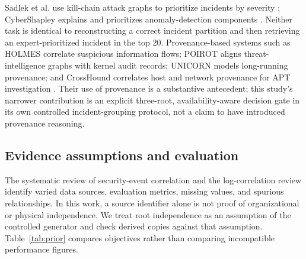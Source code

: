 Sadlek et al. use kill-chain attack graphs to prioritize incidents by severity \cite{sadlek2025}; CyberShapley explains and prioritizes anomaly-detection components \cite{malach2025}. Neither task is identical to reconstructing a correct incident partition and then retrieving an expert-prioritized incident in the top 20. Provenance-based systems such as HOLMES correlate suspicious information flows; POIROT aligns threat-intelligence graphs with kernel audit records; UNICORN models long-running provenance; and CrossHound correlates host and network provenance for APT investigation \cite{holmes2019,poirot2019,unicorn2020,crosshound2026}. Their use of provenance is a substantive antecedent; this study's narrower contribution is an explicit three-root, availability-aware decision gate in its own controlled incident-grouping protocol, not a claim to have introduced provenance reasoning.

\subsection{Evidence assumptions and evaluation}
The systematic review of security-event correlation \cite{review2022} and the log-correlation review \cite{chuah2025} identify varied data sources, evaluation metrics, missing values, and spurious relationships. In this work, a source identifier alone is not proof of organizational or physical independence. We treat root independence as an assumption of the controlled generator and check derived copies against that assumption. Table~\ref{tab:prior} compares objectives rather than comparing incompatible performance figures.

